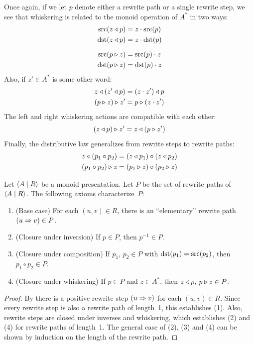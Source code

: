 \documentclass[../generics]{subfiles}
\begin{document}
\begin{definition}
Once again, if we let $p$ denote either a rewrite path or a single rewrite step, we see that whiskering is related to the monoid operation of $A^*$ in two ways:
\begin{gather*}
\operatorname{src}(z\triangleleft p)=z\cdot \operatorname{src}(p)\\
\operatorname{dst}(z\triangleleft p)=z\cdot \operatorname{dst}(p)\\[\medskipamount]
\operatorname{src}(p\triangleright z)=\operatorname{src}(p)\cdot z\\
\operatorname{dst}(p\triangleright z)=\operatorname{dst}(p)\cdot z
\end{gather*}
Also, if $z'\in A^*$ is some other word:
\begin{gather*}
z\triangleleft (z' \triangleleft p)=(z\cdot z') \triangleleft p\\
(p\triangleright z)\triangleright z'=p\triangleright (z\cdot z')
\end{gather*}
The left and right whiskering actions are compatible with each other:
\[(z\triangleleft p)\triangleright z' = z\triangleleft(p\triangleright z')\]
Finally, the distributive law generalizes from rewrite steps to rewrite paths:
\begin{gather*}
z\triangleleft (p_1 \circ p_2) = (z\triangleleft p_1) \circ (z\triangleleft p_2)\\
(p_1 \circ p_2)\triangleright z = (p_1\triangleright z) \circ (p_2\triangleright z)
\end{gather*}
\end{definition}

\begin{proposition}
Let $\langle A \mid R\rangle$ be a monoid presentation. Let $P$ be the set of rewrite paths of $\langle A \mid R\rangle$. The following axioms characterize~$P$:
\begin{enumerate}
\item (Base case) For each $(u,v)\in R$, there is an ``elementary'' rewrite path $(u\Rightarrow v)\in P$.
\item (Closure under inversion) If $p\in P$, then $p^{-1}\in P$.
\item (Closure under composition) If $p_1$, $p_2\in P$ with $\operatorname{dst}(p_1)=\operatorname{src}(p_2)$, then $p_1\circ p_2\in P$.
\item (Closure under whiskering) If $p\in P$ and $z\in A^*$, then $z\triangleleft p$, $p\triangleright z\in P$.
\end{enumerate}
\end{proposition}
\begin{proof}
By  there is a positive rewrite step $(u\Rightarrow v)$ for each $(u,v)\in R$. Since every rewrite step is also a rewrite path of length~1, this establishes (1). Also, rewrite steps are closed under inverses and whiskering, which establishes (2) and (4) for rewrite paths of length~1. The general case of (2), (3) and (4) can be shown by induction on the length of the rewrite path.
\end{proof}
\end{document}
